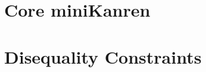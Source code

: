 \documentclass[onecolumn, 11pt, oneside, openright]{book}
\begin{document}
{
\setcounter{tocdepth}{1}
\setlength{\parskip}{0pt}
\tableofcontents
}

\newpage

\mainmatter



\part{Core miniKanren}\label{coremkpart}












\part{Disequality Constraints}\label{diseqpart}

\end{document}
